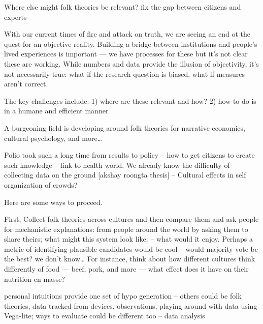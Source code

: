 Where else might folk theories be relevant?
fix the gap between citizens and experts

With our current times of fire and attack on truth, we are seeing an end ot the quest for an objective reality. Building a bridge between institutions and people’s lived experiences is important — we have processes for these but it’s not clear these are working. While numbers and data provide the illusion of objectivity, it’s not necessarily true: what if the research question is biased, what if measures aren’t correct. 

The key challenges include: 1) where are these relevant and how? 2) how to do is in a humane and efficient manner

A burgeoning field is developing around folk theories for narrative economics, cultural psychology, and more… 

Polio took such a long time from results to policy --  how to get citizens to create such knowledge -- link to health world. We already know the difficulty of collecting data on the ground [akshay roongta thesis] -- Cultural effects in self organization of crowds?

Here are some ways to proceed.

First, Collect folk theories across cultures and then compare them and ask people for mechanistic explanations: from people around the world by asking them to share theirs; what might this system look like: -- what would it enjoy. Perhaps a metric of identifying plausible candidates would be cool -- would majority vote be the best? we don't know… For instance, think about how different cultures think differently of food — beef, pork, and more — what effect does it have on their nutrition en masse?

personal intuitions provide one set of hypo generation -- others could be folk theories, data tracked from devices, observations, playing around with data using Vega-lite; ways to evaluate could be different too -- data analysis



